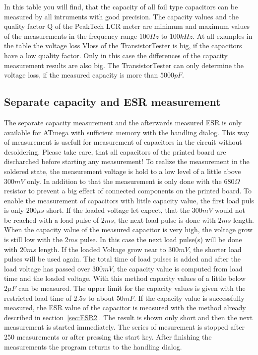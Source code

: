 In this table you will find, that the capacity of all foil type capacitors can be measured by all intruments
with good precision.
The capacity values and the quality factor Q of the PeakTech LCR meter are minimum and maximum values of the
measurements in the frequency range \(100Hz\) to \(100kHz\).
At all examples in the table the voltage loss Vloss of the TransistorTester is big,
if the capacitors have a low quality factor.
Only in this case the differences of the capacity measurement results are also big.
The TransistorTester can only determine the voltage loss, if the measured capacity is more than \(5000pF\).

\subsection{Separate capacity and ESR measurement}
The separate capacity measurement and the afterwards measured ESR is only available for ATmega with sufficient 
memory with the handling dialog. This way of measurement is usefull for measurement of capacitors in the
circuit without desoldering.
Please take care, that all capacitors of the printed board are discharched before starting any measurement!
To realize the measurement in the soldered state, the measurement voltage is hold
to a low level of a little above \(300mV\) only.
In addition to that the measurement is only done with the \(680\Omega\) resistor to prevent a
big effect of connected components on the printed board.
To enable the measurement of capacitors with little capacity value, the first load puls is only
\(200\mu s\) short. If the loaded voltage let expect, that the \(300mV\) would not be reached with
a load pulse of \(2ms\), the next load pulse is done with \(2ms\) length.
When the capacity value of the measured capacitor is very high, the voltage grow is still low
with the \(2ms\) pulse. In this case the next load pulse(s) will be done with \(20ms\) length.
If the loaded Voltage grow near to \(300mV\), the shorter load pulses will be used again.
The total time of load pulses is added and after the load voltage has passed over \(300mV\), the
capacity value is computed from load time and the loaded voltage.
With this method capacity values of a little below \(2\mu F\) can be measured. The upper limit for the capacity
values is given with the restricted load time of \(2.5s\) to about \(50mF\).
If the capacity value is successfully measured, the ESR value of the capacitor is measured with the
method already described in section~\ref{sec:ESR2}.
The result is shown only short and then the next measurement is started immediately.
The series of mesurement is stopped after 250 measurements or after pressing the start key.
After finishing the measurements the program returns to the handling dialog.



